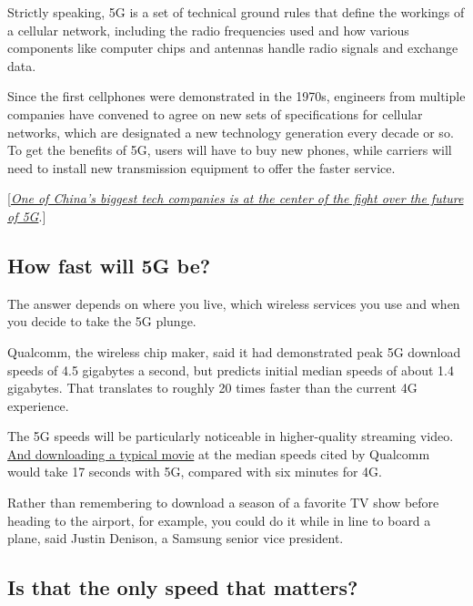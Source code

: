 Strictly speaking, 5G is a set of technical ground rules that define the
workings of a cellular network, including the radio frequencies used and
how various components like computer chips and antennas handle radio
signals and exchange data.

Since the first cellphones were demonstrated in the 1970s, engineers
from multiple companies have convened to agree on new sets of
specifications for cellular networks, which are designated a new
technology generation every decade or so. To get the benefits of 5G,
users will have to buy new phones, while carriers will need to install
new transmission equipment to offer the faster service.

{[}\href{https://www.nytimes.com/2018/03/07/technology/china-huawei-5g-standards.html}{\emph{One
of China's biggest tech companies is at the center of the fight over the
future of 5G}}.{]}

\hypertarget{how-fast-will-5g-be}{%
\subsection{How fast will 5G be?}\label{how-fast-will-5g-be}}

The answer depends on where you live, which wireless services you use
and when you decide to take the 5G plunge.

Qualcomm, the wireless chip maker, said it had demonstrated peak 5G
download speeds of 4.5 gigabytes a second, but predicts initial median
speeds of about 1.4 gigabytes. That translates to roughly 20 times
faster than the current 4G experience.

The 5G speeds will be particularly noticeable in higher-quality
streaming video.
\href{https://www.nytimes.com/2016/02/22/technology/what-5g-will-mean-for-you.html}{And
downloading a typical movie} at the median speeds cited by Qualcomm
would take 17 seconds with 5G, compared with six minutes for 4G.

Rather than remembering to download a season of a favorite TV show
before heading to the airport, for example, you could do it while in
line to board a plane, said Justin Denison, a Samsung senior vice
president.

\hypertarget{is-that-the-only-speed-that-matters}{%
\subsection{Is that the only speed that
matters?}\label{is-that-the-only-speed-that-matters}}

